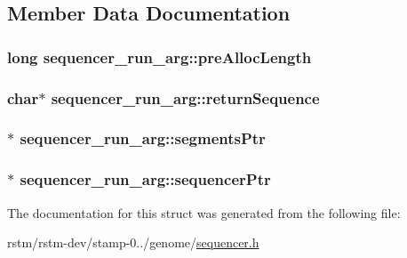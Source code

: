 \subsection{Member Data Documentation}
\hypertarget{structsequencer__run__arg_affa4e41e3f021686e5c8a2033eca2448}{
\subsubsection[{pre\-Alloc\-Length}]{\setlength{\rightskip}{0pt plus 5cm}long sequencer\-\_\-run\-\_\-arg\-::pre\-Alloc\-Length}}\label{structsequencer__run__arg_affa4e41e3f021686e5c8a2033eca2448}
\hypertarget{structsequencer__run__arg_a14fa65be071d6224345a237c7133c62f}{
\subsubsection[{return\-Sequence}]{\setlength{\rightskip}{0pt plus 5cm}char$\ast$ sequencer\-\_\-run\-\_\-arg\-::return\-Sequence}}\label{structsequencer__run__arg_a14fa65be071d6224345a237c7133c62f}
\hypertarget{structsequencer__run__arg_a706577675c53ef200da45648a9d9ac35}{
\subsubsection[{segments\-Ptr}]{$\ast$ sequencer\-\_\-run\-\_\-arg\-::segments\-Ptr}}\label{structsequencer__run__arg_a706577675c53ef200da45648a9d9ac35}
\hypertarget{structsequencer__run__arg_ac42a149eb5d281ad9d11defc19d4668d}{
\subsubsection[{sequencer\-Ptr}]{$\ast$ sequencer\-\_\-run\-\_\-arg\-::sequencer\-Ptr}}\label{structsequencer__run__arg_ac42a149eb5d281ad9d11defc19d4668d}


The documentation for this struct was generated from the following file\-:\begin{DoxyCompactItemize}
\item 
rstm/rstm-\/dev/stamp-\/0../genome/\hyperlink{sequencer_8h}{sequencer.\-h}\end{DoxyCompactItemize}
